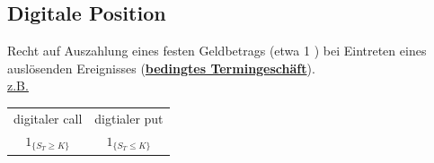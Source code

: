 \documentclass[a4paper, pagesize=pdftex, pdftex, twoside, headsepline, index=totoc,toc=listof, fontsize=10pt, cleardoublepage=empty, headinclude, DIV=13, BCOR=13mm]{scrartcl}
\newcommand{\bet}[1]{\uline{\textbf{#1}}} %
\begin{document}

\subsection{Digitale Position}
\label{sub: digitale_position}
Recht auf Auszahlung eines festen Geldbetrags (etwa 1 \texteuro) bei Eintreten eines auslösenden Ereignisses (\bet{bedingtes Termingeschäft}).\\
\uline{z.B.}\\
\begin{tabular}{c c}
	digitaler call & digtialer put\\
	$1_{\{S_T\ge K\}}$ & $1_{\{S_T\le K \}}$ \\
\end{tabular}

\end{document}
